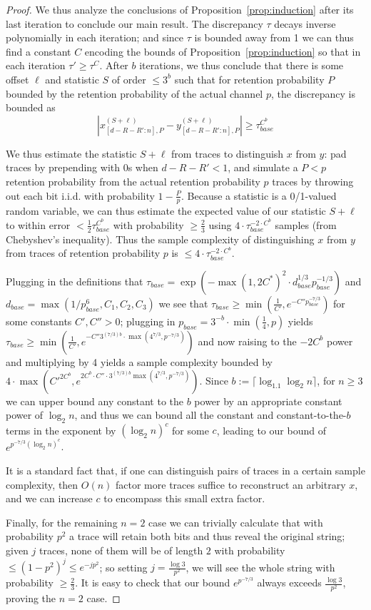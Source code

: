 \documentclass[11pt]{article}
\theoremstyle{plain}
\begin{document}
\begin{proof}
We thus analyze the conclusions of Proposition~\ref{prop:induction} after its last iteration to conclude our main result. The discrepancy $\tau$ decays inverse polynomially in each iteration; and since $\tau$ is bounded away from 1 we can thus find a constant $C$ encoding the bounds of Proposition~\ref{prop:induction} so that in each iteration $\tau'\geq \tau^C$. After $b$ iterations, we thus conclude that there is some offset $\ell$ and statistic $S$ of order $\leq 3^b$ such that for retention probability $P$ bounded by the retention probability of the actual channel $p$, the discrepancy is bounded as \[|x_{[d-R-R':n],P}^{(S+\ell)}-y_{[d-R-R':n],P}^{(S+\ell)}|\geq \tau_{base}^{C^b}\]

We thus estimate the statistic $S+\ell$ from traces to distinguish $x$ from $y$: pad traces by prepending with 0s when $d-R-R'<1$, and simulate a $P<p$ retention probability from the actual retention probability $p$ traces by throwing out each bit i.i.d. with probability $1-\frac{P}{p}$. 
Because a statistic is a 0/1-valued random variable, we can thus estimate the expected value of our statistic $S+\ell$ to within error $<\frac{1}{2}\tau_{base}^{C^b}$ with probability $\geq\frac{2}{3}$ using $4\cdot\tau_{base}^{-2\cdot C^b}$ samples (from Chebyshev's inequality). Thus the sample complexity of distinguishing $x$ from $y$ from traces of retention probability $p$ is $\leq 4\cdot\tau_{base}^{-2\cdot C^b}$.

Plugging in the definitions that  $\tau_{base}=\exp(-\max(1,2C^*)^2 \cdot d_{base}^{1/3} p_{base}^{-1/3})$ and $d_{base}=\max(1/p_{base}^6,C_1,C_2,C_3)$ we see that $\tau_{base}\geq \min(\frac{1}{C'},e^{-C''p_{base}^{-7/3}})$ for some constants $C',C''>0$; plugging in $p_{base}=3^{-b}\cdot \min(\frac{1}{4},p)$ yields $\tau_{base}\geq \min(\frac{1}{C'},e^{-C''3^{(7/3)b}\cdot\max(4^{7/3},p^{-7/3})})$ and now raising to the $-2C^b$ power and multiplying by 4 yields a sample complexity bounded by $4\cdot \max({C'}^{2C^b},e^{2 C^b\cdot C''\cdot3^{(7/3)b}\max(4^{7/3},p^{-7/3})})$. Since $b:=\lceil\log_{1.1} \log_2 n\rceil$, for $n\geq 3$ we can upper bound any constant to the $b$ power by an appropriate constant power of $\log_2 n$, and thus we can bound all the constant and constant-to-the-$b$ terms in the exponent by $(\log_2 n)^c$ for some $c$, leading to our bound of $e^{p^{-7/3}(\log_2 n)^c}$.

It is a standard fact that, if one can distinguish pairs of traces in a certain sample complexity, then $O(n)$ factor more traces suffice to reconstruct an arbitrary $x$, and we can increase $c$ to encompass this small extra factor.

Finally, for the remaining $n=2$ case we can trivially calculate that with probability $p^2$ a trace will retain both bits and thus reveal the original string; given $j$ traces, none of them will be of length $2$ with probability $\leq (1-p^2)^j\leq e^{-jp^2}$; so setting $j=\frac{\log 3}{p^2}$, we will see the whole string with probability $\geq \frac{2}{3}$. It is easy to check that our bound $e^{p^{-7/3}}$ always exceeds $\frac{\log 3}{p^2}$, proving the $n=2$ case.
\end{proof}
\end{document}
